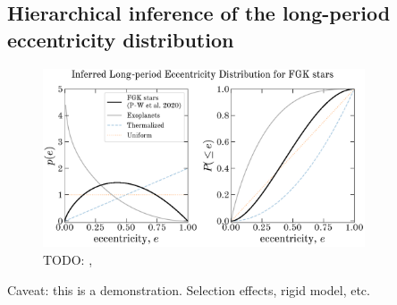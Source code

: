 \documentclass[modern]{aastex63}
\begin{document}
\subsection{Hierarchical inference of the long-period eccentricity distribution}

\begin{figure}[!t]
    \begin{center}
    \includegraphics[width=0.85\textwidth]{eccentricity-distr.pdf}
    \end{center}
    \caption{%
    TODO: \citep{Kipping:2013}, \citep{Jeans:1919}
    \label{fig:eccdist}
    }
\end{figure}


Caveat: this is a demonstration. Selection effects, rigid model, etc.


\end{document}
